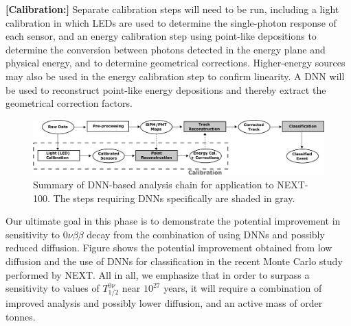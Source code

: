 \documentclass[11pt,a4paper]{article}
\begin{document}
\noindent\textbf{[Calibration:]} Separate calibration steps will need to be run, including a light calibration in which LEDs are used to determine the single-photon response of each sensor, and an energy calibration step using point-like depositions to determine the conversion between photons detected in the energy plane and physical energy, and to determine geometrical corrections. Higher-energy sources may also be used in the energy calibration step to confirm linearity. A DNN will be used to reconstruct point-like energy depositions and thereby extract the geometrical correction factors.\\

\begin{figure}[!htb]
	\centering
	\includegraphics[scale=0.18]{fig/analysis_diagram.pdf}
	\caption{\label{fig.analysis}Summary of DNN-based analysis chain for application to NEXT-100. The steps requiring DNNs specifically are shaded in gray.}
\end{figure}

Our ultimate goal in this phase is to demonstrate the potential improvement in sensitivity to $0\nu\beta\beta$ decay from the combination of using DNNs and possibly reduced diffusion. Figure shows the potential improvement obtained from low diffusion and the use of DNNs for classification in the recent Monte Carlo study \cite{NEXT_DNN} performed by NEXT. All in all, we emphasize that in order to surpass a sensitivity to values of $T^{0\nu}_{1/2}$ near $10^{27}$ years, it will require a combination of improved analysis and possibly lower diffusion, and an active mass of order tonnes.\\
\end{document}
